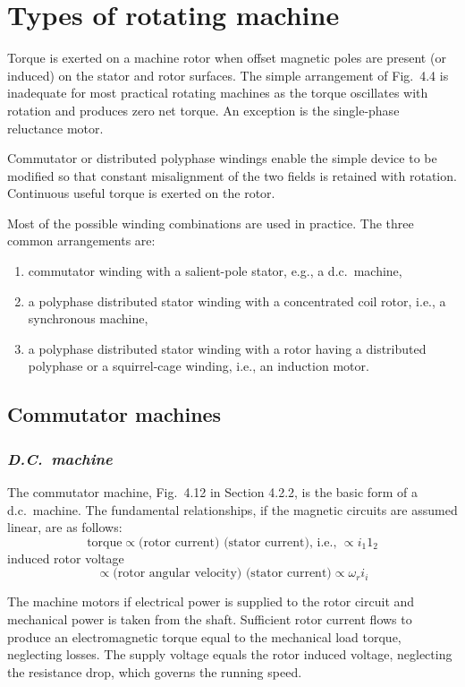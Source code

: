 \documentclass[a4paper,numbers=noenddot,12pt]{scrbook}
\begin{document}
\section{Types of rotating machine}
Torque is exerted on a machine rotor when offset magnetic poles are present (or induced) on the stator and rotor surfaces. The simple arrangement of Fig.\ 4.4 is inadequate for most practical rotating machines as the torque oscillates with rotation and produces zero net torque. An exception is the single-phase reluctance motor.

Commutator or distributed polyphase windings enable the simple device to be modified so that constant misalignment of the two fields is retained with rotation. Continuous useful torque is exerted on the rotor.

Most of the possible winding combinations are used in practice. The three common arrangements are:
\begin{enumerate}
    \item commutator winding with a salient-pole stator, e.g., a d.c.\ machine, 
    \item a polyphase distributed stator winding with a concentrated coil rotor, i.e., a synchronous machine,
    \item a polyphase distributed stator winding with a rotor having a distributed polyphase or a squirrel-cage winding, i.e., an induction motor. 
\end{enumerate}

\subsection{Commutator machines}
\subsubsection{\textit{D.C.\ machine}}
The commutator machine, Fig.\ 4.12 in Section 4.2.2, is the basic form of a d.c.\ machine. The fundamental relationships, if the magnetic circuits are assumed linear, are as follows:
\begin{equation*}
    \text{torque} \propto \text{(rotor current) (stator current), i.e., } \propto i_1 1_2
\end{equation*}
induced rotor voltage 
\begin{equation*}
    \propto \text{(rotor angular velocity) (stator current)} \propto \omega_r i_i 
\end{equation*}

The machine motors if electrical power is supplied to the rotor circuit and mechanical power is taken from the shaft. Sufficient rotor current flows to produce an electromagnetic torque equal to the mechanical load torque, neglecting losses. The supply voltage equals the rotor induced voltage, neglecting the resistance drop, which governs the running speed. 
\end{document}
